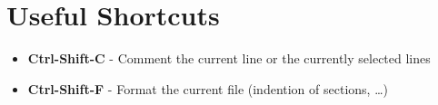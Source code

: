 \section{Useful Shortcuts}

\begin{itemize}
\item \textbf{Ctrl-Shift-C} - Comment the current line or the currently selected lines
\item \textbf{Ctrl-Shift-F} - Format the current file (indention of sections, \dots)
\end{itemize}

